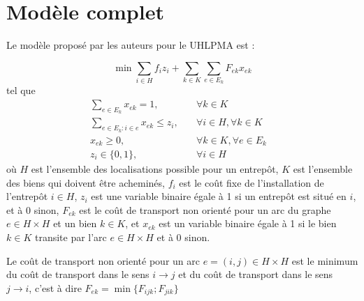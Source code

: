 \section{Modèle complet}

Le modèle proposé par les auteurs pour le UHLPMA est : 

\[ \min \sum_{i \in H}f_iz_i + \sum_{k \in K}\sum_{e \in E_k}F_{ek}x_{ek}\]
tel que
\begin{subequations}
    \begin{align}
        \sum_{e \in E_k}x_{ek} = 1, \quad &\forall{k\in K}&\\
        \sum_{e \in E_k:i\in e}x_{ek} \le z_i,\quad &\forall{i \in H}, \forall{k\in K}&\\
        x_{ek} \ge 0, \quad &\forall{k \in K}, \forall{e \in E_k}&\\
        z_i\in \{0,1\},\quad &\forall{ i \in H}&
    \end{align}
\end{subequations}
 où $H$ est l'ensemble des localisations possible pour un entrepôt, $K$ est l'ensemble des biens qui doivent être acheminés, $f_i$ est le coût fixe de l'installation de l'entrepôt $i\in H$, $z_i$ est une variable binaire égale à 1 si un entrepôt est situé en $i$, et à 0 sinon, $F_{ek}$ est le coût de transport non orienté pour un arc du graphe $e \in H\times H$ et un bien $k \in K$, et $x_{ek}$ est un variable binaire égale à 1 si le bien $k \in K$ transite par l'arc $e \in H\times H$ et à 0 sinon.
 
 Le coût de transport non orienté pour un arc $e = (i,j) \in H\times H$ est le minimum du coût de transport dans le sens $i \rightarrow j$ et du coût de transport dans le sens $j \rightarrow i$, c'est à dire $F_{ek} = \min \{ F_{ijk};F_{jik}\}$


